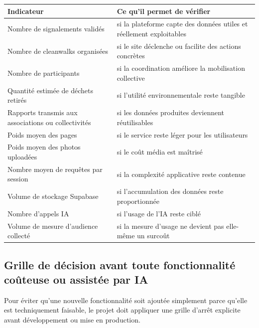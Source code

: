 \documentclass[
  10pt,
  a4paper,
  DIV=11,
  numbers=noendperiod,
  oneside]{scrreprt}
\newcounter{none} %
\begin{document}
{\def\LTcaptype{none} %
\begin{longtable}[]{@{}
  >{\raggedright\arraybackslash}p{}
  >{\raggedright\arraybackslash}p{}@{}}
\toprule\noalign{}
\begin{minipage}[b]{\linewidth}\raggedright
Indicateur
\end{minipage} & \begin{minipage}[b]{\linewidth}\raggedright
Ce qu'il permet de vérifier
\end{minipage} \\
\midrule\noalign{}
\endhead
\bottomrule\noalign{}
\endlastfoot
Nombre de signalements validés & si la plateforme capte des données
utiles et réellement exploitables \\
Nombre de cleanwalks organisées & si le site déclenche ou facilite des
actions concrètes \\
Nombre de participants & si la coordination améliore la mobilisation
collective \\
Quantité estimée de déchets retirés & si l'utilité environnementale
reste tangible \\
Rapports transmis aux associations ou collectivités & si les données
produites deviennent réutilisables \\
Poids moyen des pages & si le service reste léger pour les
utilisateurs \\
Poids moyen des photos uploadées & si le coût média est maîtrisé \\
Nombre moyen de requêtes par session & si la complexité applicative
reste contenue \\
Volume de stockage Supabase & si l'accumulation des données reste
proportionnée \\
Nombre d'appels IA & si l'usage de l'IA reste ciblé \\
Volume de mesure d'audience collecté & si la mesure d'usage ne devient
pas elle-même un surcoût \\
\end{longtable}
}

\subsection{Grille de décision avant toute fonctionnalité coûteuse ou
assistée par
IA}\label{grille-de-duxe9cision-avant-toute-fonctionnalituxe9-couxfbteuse-ou-assistuxe9e-par-ia}

Pour éviter qu'une nouvelle fonctionnalité soit ajoutée simplement parce
qu'elle est techniquement faisable, le projet doit appliquer une grille
d'arrêt explicite avant développement ou mise en production.
\end{document}
